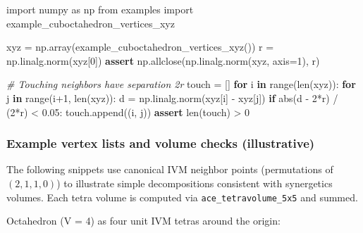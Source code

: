 \documentclass[
  10pt,
]{article}
\newenvironment{Shaded}{}{}
\newcommand{\BuiltInTok}[1]{#1}
\newcommand{\CommentTok}[1]{\textcolor[rgb]{0.38,0.63,0.69}{\textit{#1}}}
\newcommand{\ControlFlowTok}[1]{\textcolor[rgb]{0.00,0.44,0.13}{\textbf{#1}}}
\newcommand{\DecValTok}[1]{\textcolor[rgb]{0.25,0.63,0.44}{#1}}
\newcommand{\FloatTok}[1]{\textcolor[rgb]{0.25,0.63,0.44}{#1}}
\newcommand{\ImportTok}[1]{#1}
\newcommand{\KeywordTok}[1]{\textcolor[rgb]{0.00,0.44,0.13}{\textbf{#1}}}
\newcommand{\NormalTok}[1]{#1}
\newcommand{\OperatorTok}[1]{\textcolor[rgb]{0.40,0.40,0.40}{#1}}
\begin{document}
\begin{Shaded}
\begin{Highlighting}[]
\ImportTok{import}\NormalTok{ numpy }\ImportTok{as}\NormalTok{ np}
\ImportTok{from}\NormalTok{ examples }\ImportTok{import}\NormalTok{ example\_cuboctahedron\_vertices\_xyz}

\NormalTok{xyz }\OperatorTok{=}\NormalTok{ np.array(example\_cuboctahedron\_vertices\_xyz())}
\NormalTok{r }\OperatorTok{=}\NormalTok{ np.linalg.norm(xyz[}\DecValTok{0}\NormalTok{])}
\ControlFlowTok{assert}\NormalTok{ np.allclose(np.linalg.norm(xyz, axis}\OperatorTok{=}\DecValTok{1}\NormalTok{), r)}

\CommentTok{\# Touching neighbors have separation 2r}
\NormalTok{touch }\OperatorTok{=}\NormalTok{ []}
\ControlFlowTok{for}\NormalTok{ i }\KeywordTok{in} \BuiltInTok{range}\NormalTok{(}\BuiltInTok{len}\NormalTok{(xyz)):}
    \ControlFlowTok{for}\NormalTok{ j }\KeywordTok{in} \BuiltInTok{range}\NormalTok{(i}\OperatorTok{+}\DecValTok{1}\NormalTok{, }\BuiltInTok{len}\NormalTok{(xyz)):}
\NormalTok{        d }\OperatorTok{=}\NormalTok{ np.linalg.norm(xyz[i] }\OperatorTok{{-}}\NormalTok{ xyz[j])}
        \ControlFlowTok{if} \BuiltInTok{abs}\NormalTok{(d }\OperatorTok{{-}} \DecValTok{2}\OperatorTok{*}\NormalTok{r) }\OperatorTok{/}\NormalTok{ (}\DecValTok{2}\OperatorTok{*}\NormalTok{r) }\OperatorTok{\textless{}} \FloatTok{0.05}\NormalTok{:}
\NormalTok{            touch.append((i, j))}
\ControlFlowTok{assert} \BuiltInTok{len}\NormalTok{(touch) }\OperatorTok{\textgreater{}} \DecValTok{0}
\end{Highlighting}
\end{Shaded}

\hypertarget{example-vertex-lists-and-volume-checks-illustrative}{%
\subsubsection{Example vertex lists and volume checks
(illustrative)}\label{example-vertex-lists-and-volume-checks-illustrative}}

The following snippets use canonical IVM neighbor points (permutations
of \((2,1,1,0)\)) to illustrate simple decompositions consistent with
synergetics volumes. Each tetra volume is computed via
\texttt{ace\_tetravolume\_5x5} and summed.

Octahedron (V = 4) as four unit IVM tetras around the origin:
\end{document}
